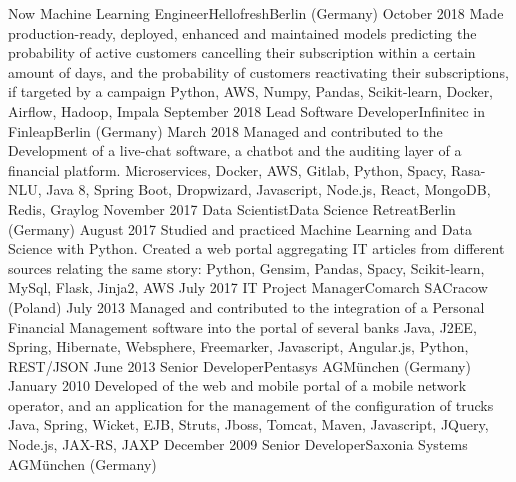 %
%
%
\begin{experiences}
 \experience
    {Now}       {Machine Learning Engineer}{Hellofresh}{Berlin (Germany)}
    {October 2018}  {Made production-ready, deployed, enhanced and maintained models predicting the probability of active customers cancelling their subscription within a certain amount of days, and the probability of customers reactivating their subscriptions, if targeted by a campaign  
                     }
                    {Python, AWS, Numpy, Pandas, Scikit-learn, Docker, Airflow, Hadoop, Impala}
  \emptySeparator
  \experience
    {September 2018}       {Lead Software Developer}{Infinitec in Finleap}{Berlin (Germany)}
    {March 2018}  {Managed and contributed to the Development of a live-chat software, a chatbot and the auditing layer of a financial platform.}
                    {Microservices, Docker, AWS, Gitlab, Python, Spacy, Rasa-NLU, Java 8, Spring Boot, Dropwizard, Javascript, Node.js, React, MongoDB, Redis, Graylog}
  \emptySeparator
  \experience
    {November 2017}   {Data Scientist}{Data Science Retreat}{Berlin (Germany)}
    {August 2017}  {Studied and practiced Machine Learning and Data Science with Python. Created a web portal aggregating IT articles from different sources relating the same story: 
			}
                    {Python, Gensim, Pandas, Spacy, Scikit-learn, MySql, Flask, Jinja2, AWS}
  \emptySeparator
  \experience
    {July 2017} {IT Project Manager}{Comarch SA}{Cracow (Poland)}
    {July 2013} {Managed and contributed to the integration of a Personal Financial Management software into the portal of several banks}
                    {Java, J2EE, Spring, Hibernate, Websphere, Freemarker, Javascript, Angular.js, Python, REST/JSON}
  \emptySeparator
  \experience
    {June 2013}    {Senior Developer}{Pentasys AG}{München (Germany)}
    {January 2010} {Developed of the web and mobile portal of a mobile network operator, and an application for the management of the configuration of trucks}
                    {Java, Spring, Wicket, EJB, Struts, Jboss, Tomcat, Maven, Javascript, JQuery, Node.js, JAX-RS, JAXP}
  \emptySeparator
  \experience
  {December 2009}   {Senior Developer}{Saxonia Systems AG}{München (Germany)}

\end{experiences}
